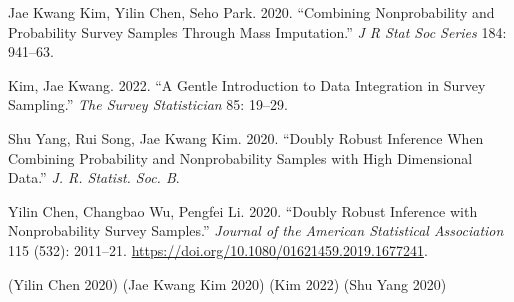 \documentclass[
  letterpaper,
  DIV=11,
  numbers=noendperiod]{scrreprt}
\newlength{\cslhangindent}
\newlength{\cslentryspacingunit} %
\newenvironment{CSLReferences}[2] %
 {%
  \setlength{\parindent}{0pt}
  \ifodd #1
  \let\oldpar\par
  \def\par{\hangindent=\cslhangindent\oldpar}
  \fi
  \setlength{\parskip}{#2\cslentryspacingunit}
 }%
 {}
\begin{document}
\hypertarget{refs}{}
\begin{CSLReferences}{1}{0}
\leavevmode{}%
Jae Kwang Kim, Yilin Chen, Seho Park. 2020. {``Combining Nonprobability
and Probability Survey Samples Through Mass Imputation.''} \emph{J R
Stat Soc Series} 184: 941--63.

\leavevmode{}%
Kim, Jae Kwang. 2022. {``A Gentle Introduction to Data Integration in
Survey Sampling.''} \emph{The Survey Statistician} 85: 19--29.

\leavevmode{}%
Shu Yang, Rui Song, Jae Kwang Kim. 2020. {``Doubly Robust Inference When
Combining Probability and Nonprobability Samples with High Dimensional
Data.''} \emph{J. R. Statist. Soc. B}.

\leavevmode{}%
Yilin Chen, Changbao Wu, Pengfei Li. 2020. {``Doubly Robust Inference
with Nonprobability Survey Samples.''} \emph{Journal of the American
Statistical Association} 115 (532): 2011--21.
\url{https://doi.org/10.1080/01621459.2019.1677241}.

\end{CSLReferences}

(Yilin Chen 2020) (Jae Kwang Kim 2020) (Kim 2022) (Shu Yang 2020)
\end{document}
